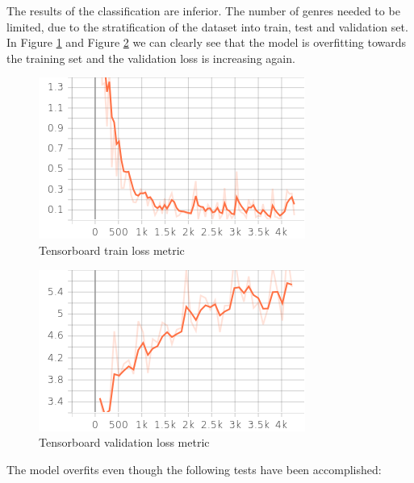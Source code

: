 \documentclass[conference]{IEEEtran}
\begin{document}
The results of the classification are inferior. The number of genres needed to be limited, due to the stratification of the dataset into train, test and validation set. In Figure \ref{fig:train_loss} and Figure \ref{fig:val_loss} we can clearly see that the model is overfitting towards the training set and the validation loss is increasing again. 

\begin{figure}
\centering
\includegraphics[width=1\linewidth]{../Imgs/train_loss}
\caption{Tensorboard train loss metric}
\label{fig:train_loss}
\end{figure}

\begin{figure}
\centering
\includegraphics[width=1\linewidth]{../Imgs/val_loss}
\caption{Tensorboard validation loss metric}
\label{fig:val_loss}
\end{figure}

The model overfits even though the following tests have been accomplished:
\end{document}
